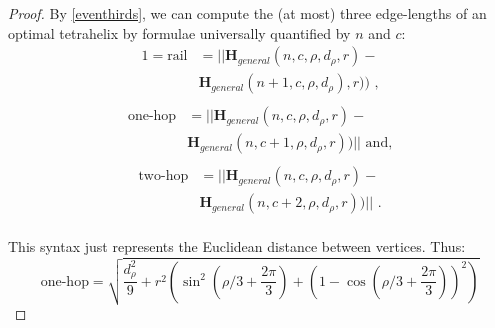 \documentclass[twocolumn,10pt]{asme2ej}
\renewcommand{\vec}[1]{\mathbf{#1}}
\begin{document}
\begin{proof}
By \cref{eventhirds}, we can compute the (at most) three edge-lengths of an optimal
tetrahelix by formulae universally quantified by $n$ and $c$:
\begin{equation}
  \begin{split}
  1 = \text{rail} &= || \vec{H}_{general}(n,c,\rho,d_{\rho},r)  - \\
  &  \vec{H}_{general}(n+1,c,\rho,d_{\rho}),r))  \text{ ,} \\
  \end{split}
\end{equation}
\begin{equation}
  \begin{split}  
  \text{one-hop} &= || \vec{H}_{general}(n,c,\rho,d_{\rho},r)  - \\
  &  \vec{H}_{general}(n,c+1,\rho,d_{\rho},r)) || \text{ and,} \\
  \end{split}  
\end{equation}  
  \begin{equation}
  \begin{split}    
  \text{two-hop} &= || \vec{H}_{general}(n,c,\rho,d_{\rho},r)  - \\
  &  \vec{H}_{general}(n,c+2,\rho,d_{\rho},r)) || \text{ .}\\
  \end{split}  
\end{equation}  

This syntax just represents the Euclidean distance between vertices. Thus:
\begin{equation}
  \text{one-hop}  = \sqrt{\frac{d_{\rho}^2}{9} + r^2(\sin^2(\rho/3 + \frac{2\pi}{3})  + (1 - \cos(\rho/3 + \frac{2\pi}{3}))^2)} 
\end{equation}


\end{proof}
\end{document}
